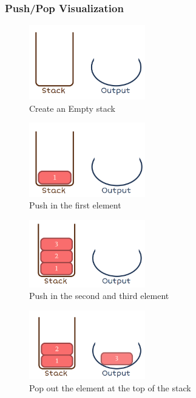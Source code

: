\subsubsection{Push/Pop Visualization}
\begin{figure}[H]
		\centering
		\includegraphics[width=0.45\textwidth]{figures/empty-stack}
		\caption{Create an Empty stack}
\end{figure}
\begin{figure}[H]
	\centering
	\includegraphics[width=0.45\textwidth]{figures/push-1}
	\caption{Push in the first element}
\end{figure}
\begin{figure}[H]
	\centering
	\includegraphics[width=0.45\textwidth]{figures/push-2-3}
	\caption{Push in the second and third element}
\end{figure}
\begin{figure}[H]
	\centering
	\includegraphics[width=0.45\textwidth]{figures/pop-3}
	\caption{Pop out the element at the top of the stack}
\end{figure}

